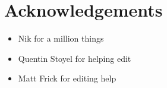 \section*{Acknowledgements}
\label{sec:acknowledgements}

{
    \color{ForestGreen}
    \begin{itemize}
        \item Nik for a million things
        \item Quentin Stoyel for helping edit
        \item Matt Frick for editing help
    \end{itemize}
}


